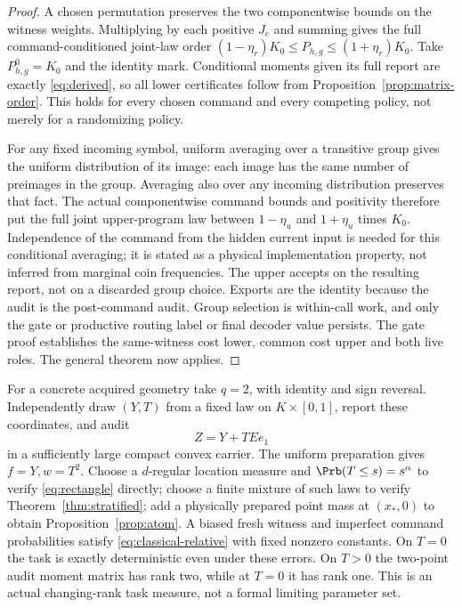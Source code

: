 \begin{proof}
A chosen permutation preserves the two componentwise bounds on the witness weights. Multiplying by each positive $J_e$ and summing gives the full command-conditioned joint-law order
$(1-\eta_r)K_0\le P_{h,g}\le(1+\eta_r)K_0$.
Take $P^0_{h,g}=K_0$ and the identity mark. Conditional moments given its full report are exactly \eqref{eq:derived}, so all lower certificates follow from Proposition~\ref{prop:matrix-order}. This holds for every chosen command and every competing policy, not merely for a randomizing policy.

For any fixed incoming symbol, uniform averaging over a transitive group gives the uniform distribution of its image: each image has the same number of preimages in the group. Averaging also over any incoming distribution preserves that fact. The actual componentwise command bounds and positivity therefore put the full joint upper-program law between $1-\eta_u$ and $1+\eta_u$ times $K_0$. Independence of the command from the hidden current input is needed for this conditional averaging; it is stated as a physical implementation property, not inferred from marginal coin frequencies. The upper accepts on the resulting report, not on a discarded group choice. Exports are the identity because the audit is the post-command audit. Group selection is within-call work, and only the gate or productive routing label or final decoder value persists. The gate proof establishes the same-witness cost lower, common cost upper and both live roles. The general theorem now applies.
\end{proof}

For a concrete acquired geometry take $q=2$, with identity and sign reversal. Independently draw $(Y,T)$ from a fixed law on $K\times[0,1]$, report these coordinates, and audit
\begin{equation}\label{eq:classical-mark}
 Z=Y+TEe_1
\end{equation}
in a sufficiently large compact convex carrier. The uniform preparation gives $f=Y,w=T^2$. Choose a $d$-regular location measure and $\Prb(T\le s)=s^\alpha$ to verify \eqref{eq:rectangle} directly; choose a finite mixture of such laws to verify Theorem~\ref{thm:stratified}; add a physically prepared point mass at $(x_*,0)$ to obtain Proposition~\ref{prop:atom}. A biased fresh witness and imperfect command probabilities satisfy \eqref{eq:classical-relative} with fixed nonzero constants. On $T=0$ the task is exactly deterministic even under these errors. On $T>0$ the two-point audit moment matrix has rank two, while at $T=0$ it has rank one. This is an actual changing-rank task measure, not a formal limiting parameter set.

